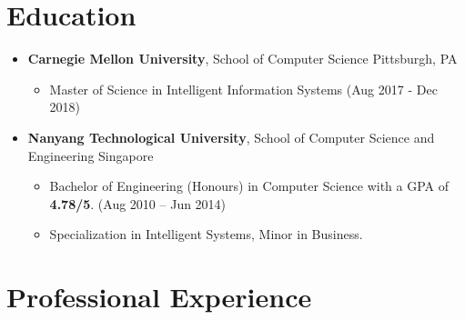 
\section{Education}\label{education}

\begin{itemize}
\tightlist
\item
  \textbf{Carnegie Mellon University}, School of Computer Science
  \hfill Pittsburgh, PA

  \begin{itemize}
  \tightlist
  \item
    Master of Science in Intelligent Information Systems \hfill (Aug
    2017 - Dec 2018)
  \end{itemize}
\item
  \textbf{Nanyang Technological University}, School of Computer Science
  and Engineering \hfill Singapore

  \begin{itemize}
  \tightlist
  \item
    Bachelor of Engineering (Honours) in Computer Science with a GPA of
    \textbf{4.78/5}. \hfill (Aug 2010 -- Jun 2014)
  \item
    Specialization in Intelligent Systems, Minor in Business.
  \end{itemize}
\end{itemize}

\section{Professional Experience}\label{professional-experience}

